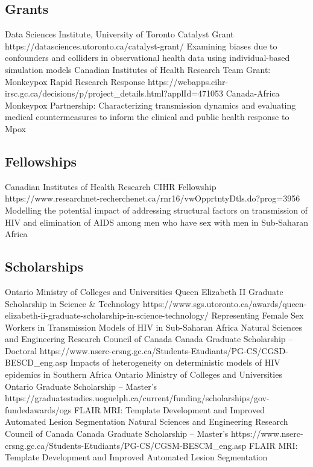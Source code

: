 \subsection{Grants}
  {Data Sciences Institute, University of Toronto}
  {Catalyst Grant}
  {https://datasciences.utoronto.ca/catalyst-grant/}
  {Examining biases due to confounders and colliders in observational health data using individual-based simulation models}
  {Canadian Institutes of Health Research}
  {Team Grant: Monkeypox Rapid Research Response}
  {https://webapps.cihr-irsc.gc.ca/decisions/p/project_details.html?applId=471053}
  {Canada-Africa Monkeypox Partnership: Characterizing transmission dynamics and evaluating medical countermeasures to inform the clinical and public health response to Mpox}
\subsection{Fellowships}
  {Canadian Institutes of Health Research}
  {CIHR Fellowship}
  {https://www.researchnet-recherchenet.ca/rnr16/vwOpprtntyDtls.do?prog=3956}
  {Modelling the potential impact of addressing structural factors on transmission of HIV and elimination of AIDS among men who have sex with men in Sub-Saharan Africa}
\subsection{Scholarships}
  {Ontario Ministry of Colleges and Universities}
  {Queen Elizabeth II Graduate Scholarship in Science \& Technology}
  {https://www.sgs.utoronto.ca/awards/queen-elizabeth-ii-graduate-scholarship-in-science-technology/}
  {Representing Female Sex Workers in Transmission Models of HIV in Sub-Saharan Africa}
  {Natural Sciences and Engineering Research Council of Canada}
  {Canada Graduate Scholarship -- Doctoral}
  {https://www.nserc-crsng.gc.ca/Students-Etudiants/PG-CS/CGSD-BESCD_eng.asp}
  {Impacts of heterogeneity on deterministic models of HIV epidemics in Southern Africa}
  {Ontario Ministry of Colleges and Universities}
  {Ontario Graduate Scholarship -- Master's}
  {https://graduatestudies.uoguelph.ca/current/funding/scholarships/gov-fundedawards/ogs}
  {FLAIR MRI: Template Development and Improved Automated Lesion Segmentation}
  {Natural Sciences and Engineering Research Council of Canada}
  {Canada Graduate Scholarship -- Master's}
  {https://www.nserc-crsng.gc.ca/Students-Etudiants/PG-CS/CGSM-BESCM_eng.asp}
  {FLAIR MRI: Template Development and Improved Automated Lesion Segmentation}

